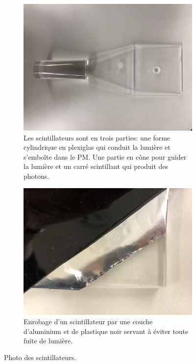 \documentclass[12pt]{article}
\begin{document}
\begin{itemize}
\begin{figure}[htbp!] 
\centering  
    \begin{subfigure}[t]{.45\textwidth}
    \includegraphics[width=1.0\textwidth]{Images/Photos/scintilateur.jpg}
    \captionsetup{width=0.8\textwidth}
    \caption{Les scintillateurs sont en trois parties: une forme cylindrique en plexiglas qui conduit la lumière et s'emboîte dans le PM. Une partie en cône pour guider la lumière et un carré scintillant qui produit des photons.}
    \label{fig:Scintillateur}
    \end{subfigure}
    \begin{subfigure}[t]{.45\textwidth}
    \includegraphics[width=1.0\textwidth]{Images/Photos/couche_scintilateur.jpg}
    \captionsetup{width=0.8\textwidth}
    \caption{Enrobage d'un scintillateur par une couche d'aluminium et de plastique noir servant à éviter toute fuite de lumière.}
    \label{fig:couche_scintilateur}
    \end{subfigure}
\caption{Photo des scintillateurs.}
\label{Scintillateurs2Fig}
\end{figure}


\end{itemize}
\end{document}
